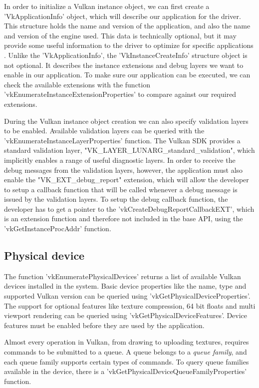 In order to initialize a Vulkan instance object, we can first create a 'VkApplicationInfo' object, which will describe our application for the driver. This structure holds the name and version of the application, and also the name and version of the engine used. This data is technically optional, but it may provide some useful information to the driver to optimize for specific applications \cite{vulkan_tutorial}. Unlike the 'VkApplicationInfo', the 'VkInstanceCreateInfo' structure object is not optional. It describes the instance extensions and debug layers we want to enable in our application. To make sure our application can be executed, we can check the available extensions with the function 'vkEnumerateInstanceExtensionProperties' to compare against our required extensions.

During the Vulkan instance object creation we can also specify validation layers to be enabled. Available validation layers can be queried with the 'vkEnumerateInstanceLayerProperties' function. The Vulkan SDK provides a standard validation layer, "VK\_LAYER\_LUNARG\_standard\_validation", which implicitly enables a range of useful diagnostic layers. In order to receive the debug messages from the validation layers, however, the application must also enable the "VK\_EXT\_debug\_report" extension, which will allow the developer to setup a callback function that will be called whenever a debug message is issued by the validation layers. To setup the debug callback function, the developer has to get a pointer to the 'vkCreateDebugReportCallbackEXT', which is an extension function and therefore not included in the base API, using the 'vkGetInstanceProcAddr' function.

\subsection{Physical device}
The function 'vkEnumeratePhysicalDevices' returns a list of available Vulkan devices installed in the system. Basic device properties like the name, type and supported Vulkan version can be queried using 'vkGetPhysicalDeviceProperties'. The support for optional features like texture compression, 64 bit floats and multi viewport rendering can be queried using 'vkGetPhysicalDeviceFeatures'. Device features must be enabled before they are used by the application.

Almost every operation in Vulkan, from drawing to uploading textures, requires commands to be submitted to a queue. A queue belongs to a \emph{queue family}, and each queue family supports certain types of commands. To query queue families available in the device, there is a 'vkGetPhysicalDeviceQueueFamilyProperties' function.

